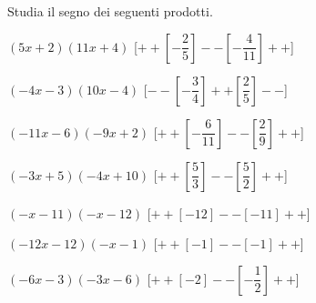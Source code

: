 \begin{esercizio}\label{ese:dis_6}
 Studia il segno dei seguenti prodotti.
 \begin{enumeratea}
  \item  \(\left(5 x +2\right)\left(11 x +4\right)\) \hfill 
  [\(++\left [-\dfrac{2}{5} \right ]--\left [-\dfrac{4}{11} \right ]++\)]
  \item  \(\left(-4 x -3\right)\left(10 x -4\right)\) \hfill 
  [\(--\left [-\dfrac{3}{4} \right ]++\left [\dfrac{2}{5} \right ]--\)]
  \item  \(\left(-11 x -6\right)\left(-9 x +2\right)\) \hfill 
  [\(++\left [-\dfrac{6}{11} \right ]--\left [\dfrac{2}{9} \right ]++\)]
  \item  \(\left(-3 x +5\right)\left(-4 x +10\right)\) \hfill 
  [\(++\left [\dfrac{5}{3} \right ]--\left [\dfrac{5}{2} \right ]++\)]
  \item  \(\left(- x -11\right)\left(- x -12\right)\) \hfill 
  [\(++\left [-12 \right ]--\left [-11 \right ]++\)]
  \item  \(\left(-12 x -12\right)\left(- x -1\right)\) \hfill 
  [\(++\left [-1 \right ]--\left [-1 \right ]++\)]
  \item  \(\left(-6 x -3\right)\left(-3 x -6\right)\) \hfill 
  [\(++\left [-2 \right ]--\left [-\dfrac{1}{2} \right ]++\)]
 \end{enumeratea}
\end{esercizio}


\subsubsection*{}

